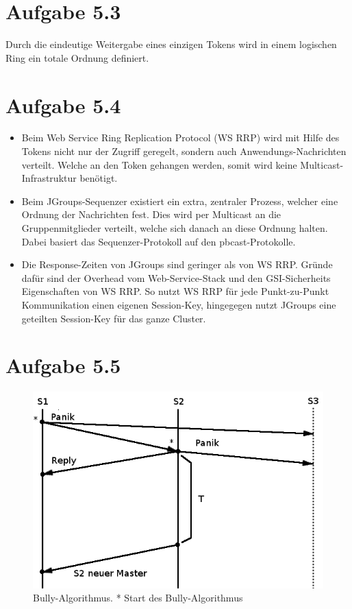 \documentclass[german,12pt,a4paper]{article}
\begin{document}
\section*{Aufgabe 5.3}

Durch die eindeutige Weitergabe eines einzigen Tokens wird in einem \glqq{}logischen Ring\grqq{} ein
totale Ordnung definiert.

\section*{Aufgabe 5.4}

\begin{itemize}

	\item Beim Web Service Ring Replication Protocol (WS RRP) wird mit Hilfe des Tokens nicht nur
		der Zugriff geregelt, sondern auch Anwendungs-Nachrichten verteilt. Welche an den Token gehangen
		werden, somit wird keine Multicast-Infrastruktur benötigt.

	\item Beim JGroups-Sequenzer existiert ein extra, zentraler Prozess, welcher eine Ordnung der
		Nachrichten fest. Dies wird per Multicast an die Gruppenmitglieder verteilt, welche sich
		danach an diese Ordnung halten. Dabei basiert das Sequenzer-Protokoll auf den
		pbcast-Protokolle.

	\item Die Response-Zeiten von JGroups sind geringer als von WS RRP. Gründe dafür sind der
		Overhead vom Web-Service-Stack und den GSI-Sicherheits Eigenschaften von WS RRP. So nutzt WS
		RRP für jede Punkt-zu-Punkt Kommunikation einen eigenen Session-Key, hingegegen nutzt
		JGroups eine geteilten Session-Key für das ganze Cluster.

\end{itemize}

\section*{Aufgabe 5.5}

\begin{figure}[h!]
  \centering
  \includegraphics[width=1\textwidth]{bully1.png}
  \caption{Bully-Algorithmus. * Start des Bully-Algorithmus}
\end{figure}
\end{document}
